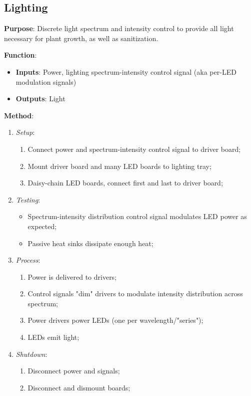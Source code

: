 \subsection{Lighting}
\label{sec:lighting}

\textbf{Purpose}: Discrete light spectrum and intensity control to provide all light necessary for plant growth, as well as sanitization.

\textbf{Function}:
\begin{itemize}
    \item \textbf{Inputs}: Power, lighting spectrum-intensity control signal (aka per-LED modulation signals)
    \item \textbf{Outputs}: Light
\end{itemize}

\textbf{Method}:
\begin{enumerate}
    \item \textit{Setup}:
    \begin{enumerate}
        \item Connect power and spectrum-intensity control signal to driver board;
        \item Mount driver board and many LED boards to lighting tray;
        \item Daisy-chain LED boards, connect first and last to driver board;
    \end{enumerate}
    \item \textit{Testing}:
    \begin{itemize}
        \item Spectrum-intensity distribution control signal modulates LED power as expected;
        \item Passive heat sinks dissipate enough heat;
    \end{itemize}
    \item \textit{Process}:
    \begin{enumerate}
        \item Power is delivered to drivers;
        \item Control signals "dim" drivers to modulate intensity distribution across spectrum;
        \item Power drivers power LEDs (one per wavelength/"series");
        \item LEDs emit light;
    \end{enumerate}
    \item \textit{Shutdown}:
    \begin{enumerate}
        \item Disconnect power and signals;
        \item Disconnect and dismount boards;
    \end{enumerate}
\end{enumerate}

